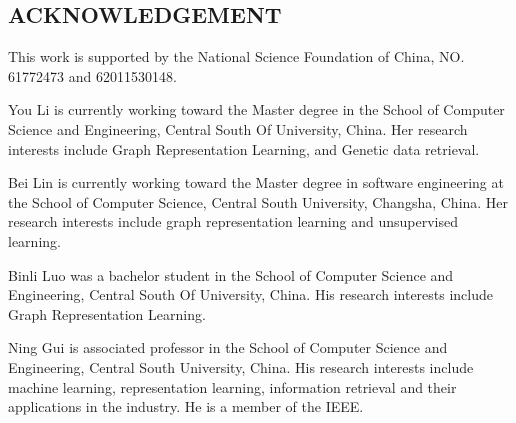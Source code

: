\documentclass[10pt,journal,compsoc]{IEEEtran}
\begin{document}
\subsection{ACKNOWLEDGEMENT}
  This work is supported by the National Science Foundation of China, NO. 61772473 and 62011530148.








\begin{IEEEbiography}{You Li}
is currently working toward the Master degree in the School of Computer Science and Engineering, Central South Of University, China. Her research interests include Graph Representation Learning, and Genetic data retrieval.
\end{IEEEbiography}
\begin{IEEEbiography}{Bei Lin} is currently working toward the Master degree in software engineering at the School of Computer Science, Central South University, Changsha, China. Her research interests include graph representation learning and unsupervised learning.
\end{IEEEbiography}

\begin{IEEEbiography}{Binli Luo} was a bachelor student in the School of Computer Science and Engineering, Central South Of University, China. His research interests include Graph Representation Learning.
\end{IEEEbiography}
\begin{IEEEbiography}{Ning Gui} is associated professor in the School of Computer Science and Engineering, Central South University, China. His research interests include machine learning, representation learning, information retrieval and their applications in the industry. He is a member of the IEEE.
\end{IEEEbiography}
\end{document}
